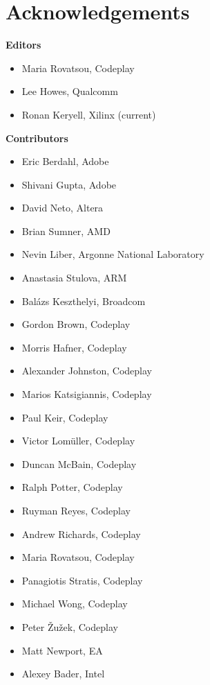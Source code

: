\chapter{Acknowledgements}

\noindent\textbf{Editors}

\begin{itemize}
\item Maria Rovatsou, Codeplay
\item Lee Howes, Qualcomm
\item Ronan Keryell, Xilinx (current)
\end{itemize}


\noindent\textbf{Contributors}

\begin{multicols}{2}
\begin{itemize}
\item
    Eric Berdahl, Adobe
\item
    Shivani Gupta, Adobe
\item
    David Neto, Altera
\item
    Brian Sumner, AMD
\item
    Nevin Liber, Argonne National Laboratory
\item
    Anastasia Stulova, ARM
\item
    Bal\'azs Keszthelyi, Broadcom
\item
    Gordon Brown, Codeplay
\item
    Morris Hafner, Codeplay
\item
    Alexander Johnston, Codeplay
\item
    Marios Katsigiannis, Codeplay
\item
    Paul Keir, Codeplay
\item
    Victor Lom\"uller, Codeplay
\item
    Duncan McBain, Codeplay
\item
    Ralph Potter, Codeplay
\item
    Ruyman Reyes, Codeplay
\item
    Andrew Richards, Codeplay
\item
    Maria Rovatsou, Codeplay
\item
    Panagiotis Stratis, Codeplay
\item
    Michael Wong, Codeplay
\item
    Peter {\v Z}u{\v z}ek, Codeplay
\item
    Matt Newport, EA
\item
    Alexey Bader, Intel

\end{itemize}
\end{multicols}
